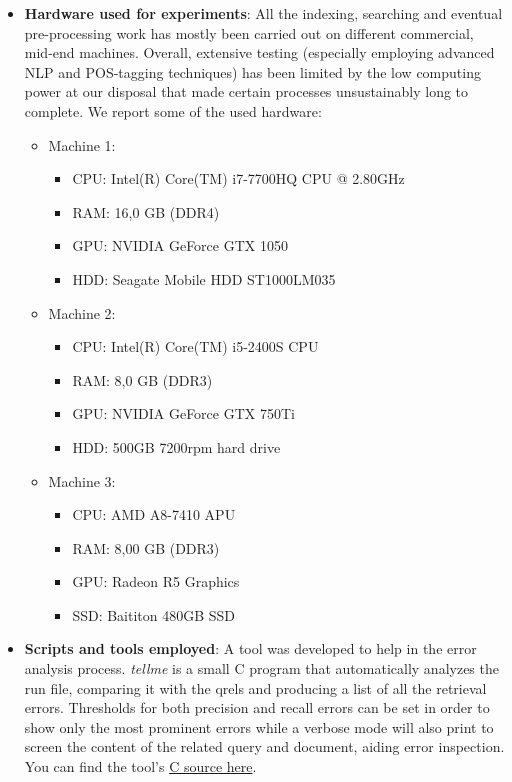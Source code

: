 \begin{itemize}
            
	\item \textbf{Hardware used for experiments}: All the indexing, searching and eventual pre-processing work has mostly been carried out on different commercial, mid-end machines. Overall, extensive testing (especially employing advanced NLP and POS-tagging techniques) has been limited by the low computing power at our disposal that made certain processes unsustainably long to complete. We report some of the used hardware:
     \begin{itemize}
         \item Machine 1:
            \begin{itemize}
                \item CPU: Intel(R) Core(TM) i7-7700HQ CPU @ 2.80GHz
                \item RAM: 16,0 GB (DDR4)
                \item GPU: NVIDIA GeForce GTX 1050
                \item HDD: Seagate Mobile HDD ST1000LM035
            \end{itemize}
        \item Machine 2:
            \begin{itemize}
                \item CPU: Intel(R) Core(TM) i5-2400S CPU
                \item RAM: 8,0 GB (DDR3)
                \item GPU: NVIDIA GeForce GTX 750Ti
                \item HDD: 500GB 7200rpm hard drive
            \end{itemize}
        \item Machine 3:
            \begin{itemize}
                \item CPU: AMD A8-7410 APU
                \item RAM: 8,00 GB (DDR3)
                \item GPU: Radeon R5 Graphics
                \item SSD: Baititon 480GB SSD 
            \end{itemize}
            
     \end{itemize}
     
	\item \textbf{Scripts and tools employed}: A tool was developed to help in the error analysis process. \emph{tellme} is a small C program that automatically analyzes the run file, comparing it with the qrels and producing a list of all the retrieval errors. Thresholds for both precision and recall errors can be set in order to show only the most prominent errors while a verbose mode will also print to screen the content of the related query and document, aiding error inspection. You can find the tool's \href{https://bitbucket.org/upd-dei-stud-prj/seupd2223-dards/src/master/tellmev3.c}{C source here}.
\end{itemize}